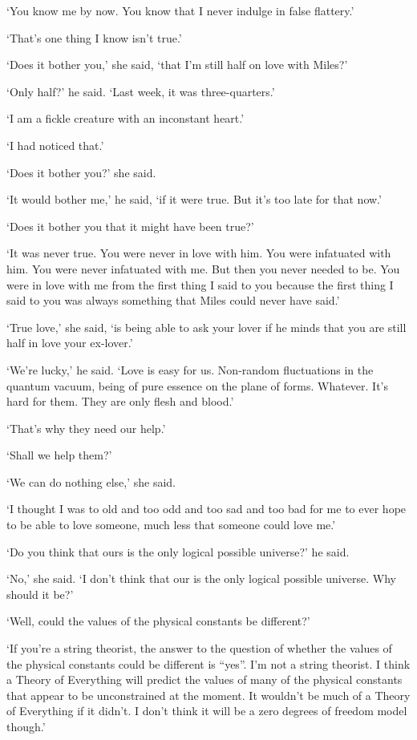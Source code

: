 `You know me by now. You know that I never indulge in false flattery.'

`That's one thing I know isn't true.'

`Does it bother you,' she said, `that I'm still half on love with Miles?'

`Only half?' he said. `Last week, it was three-quarters.'

`I am a fickle creature with an inconstant heart.'

`I had noticed that.'

`Does it bother you?' she said.

`It would bother me,' he said, `if it were true. But it's too late for that now.'

`Does it bother you that it might have been true?'

`It was never true. You were never in love with him. You were
infatuated with him. You were never infatuated with me. But then you
never needed to be. You were in love with
me from the first thing I said to you because the first thing I
said to you was always something that Miles could never have
said.'

`True love,' she said, `is being able to ask your lover if he minds that you
are still half in love your ex-lover.'

`We're lucky,' he said. `Love is easy for us. Non-random fluctuations in the
quantum vacuum, being of pure essence on the plane of forms. Whatever. It's hard for them. They are only flesh and blood.'

`That's why they need our help.'

`Shall we help them?'

`We can do nothing else,' she said.

\majorbreak
`I thought I was to old and too odd and too sad and too bad for me to
ever hope to be able to love someone, much less that someone could
love me.'

\majorbreak
`Do you think that ours is the only logical possible universe?' he said.

`No,' she said. `I don't think that our is the
only logical possible universe. Why should it be?'

`Well, could the values of the physical constants be different?'

`If you're a string theorist, the answer to the question of whether
the values of the physical constants could be different is ``yes''. I'm
not a string theorist. I think a Theory of Everything will predict
the values of many of the physical constants that appear to be
unconstrained at the moment. It wouldn't be much of a Theory of
Everything if it didn't. I don't think it will be a zero degrees of
freedom model though.'

